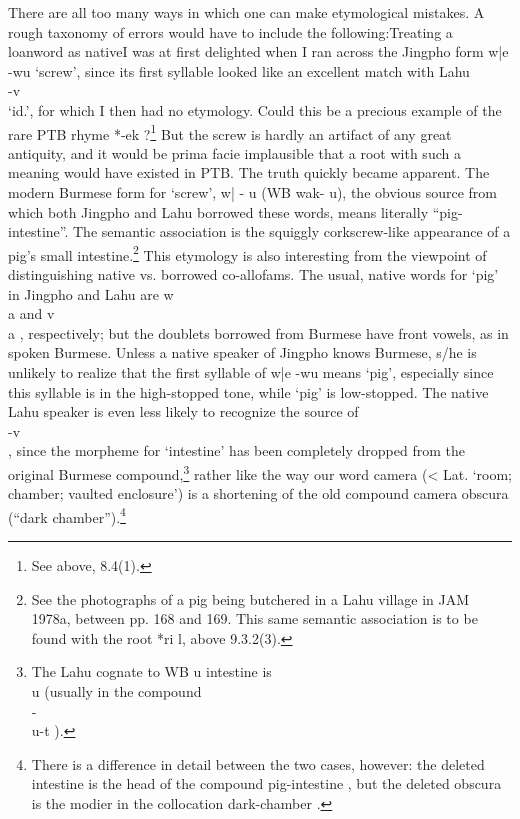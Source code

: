 \documentclass[10pt]{article}
\begin{document}
There are all too many ways in which one can make etymological mistakes. A rough taxonomy of errors would have to include the following:Treating a loanword as nativeI was at first delighted when I ran across the Jingpho form w|e -wu `screw', since its first syllable looked like an excellent match with Lahu \\\xbf -v\\   `id.', for which I then had no etymology. Could this be a precious example of the rare PTB rhyme *-ek ?\footnote{See above, 8.4(1).}
But the screw is hardly an artifact of any great antiquity, and it would be prima facie implausible that a root with such a meaning would have existed in PTB. The truth quickly became apparent. The modern Burmese form for `screw', w|  - u (WB wak- u), the obvious source from which both Jingpho and Lahu borrowed these words, means literally ``pig-intestine''. The semantic association is the squiggly corkscrew-like appearance of a pig's small intestine.\footnote{See the photographs of a pig being butchered in a Lahu village in JAM 1978a, between pp. 168 and 169. This same semantic association is to be found with the root *ri l, above 9.3.2(3).} This etymology is also interesting from the viewpoint of distinguishing native vs. borrowed co-allofams. The usual, native words for `pig' in Jingpho and Lahu are w\\a{}  and v\\a{} , respectively; but the doublets borrowed from Burmese have front vowels, as in spoken Burmese. Unless a native speaker of Jingpho knows Burmese, s/he is unlikely to realize that the first syllable of w|e -wu means `pig', especially since this syllable is in the high-stopped tone, while `pig' is low-stopped. The native Lahu speaker is even less likely to recognize the source of \\\xbf -v\\  , since the morpheme for `intestine' has been completely dropped from the original Burmese compound,\footnote{The Lahu cognate to WB  u  intestine  is  \\u (usually in the compound \\\xbf - \\u-t   ).} rather like the way our word camera (< Lat. `room; chamber; vaulted enclosure') is a shortening of the old compound camera obscura (``dark chamber'').\footnote{There is a difference in detail between the two cases, however: the deleted  intestine  is the head of the compound  pig-intestine , but the deleted obscura is the modi\xde er in the collocation  dark-chamber .}
\end{document}
